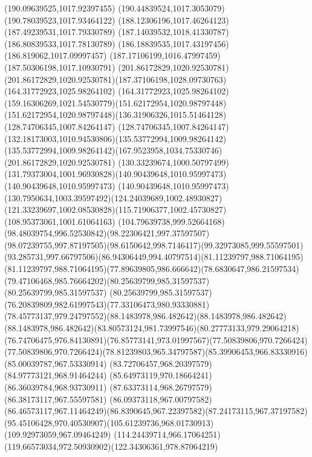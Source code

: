 {{	\lineto(190.09639525,1017.92397455)
	\lineto(190.44839524,1017.3053079)
	\lineto(190.78039523,1017.93464122)
	\closepath
	\moveto(188.12306196,1017.46264123)
	\lineto(187.49239531,1017.79330789)
	\lineto(187.14039532,1018.41330787)
	\lineto(186.80839533,1017.78130789)
	\lineto(186.18839535,1017.43197456)
	\lineto(186.819062,1017.09997457)
	\lineto(187.17106199,1016.47997459)
	\lineto(187.50306198,1017.10930791)
	\closepath
	\moveto(201.86172829,1020.92530781)
	\curveto(201.86172829,1020.92530781)(187.37106198,1028.09730763)(164.31772923,1025.98264102)
	\curveto(164.31772923,1025.98264102)(159.16306269,1021.54530779)(151.62172954,1020.98797448)
	\curveto(151.62172954,1020.98797448)(136.31906326,1015.51464128)(128.74706345,1007.84264147)
	\curveto(128.74706345,1007.84264147)(132.18173003,1010.94530806)(135.53772994,1009.98264142)
	\curveto(135.53772994,1009.98264142)(167.9523958,1034.75330746)(201.86172829,1020.92530781)
	\moveto(130.33239674,1000.50797499)
	\curveto(131.79373004,1001.96930828)(140.90439648,1010.95997473)(140.90439648,1010.95997473)
	\curveto(140.90439648,1010.95997473)(130.7950634,1003.39597492)(124.24039689,1002.48930827)
	\curveto(121.33239697,1002.08530828)(115.71906377,1002.45730827)(108.95373061,1001.61064163)
	\curveto(104.79639738,999.52664168)(98.48039754,996.52530842)(98.22306421,997.37597507)
	\curveto(98.07239755,997.87197505)(98.6150642,998.7146417)(99.32973085,999.55597501)
	\curveto(93.285731,997.66797506)(86.94306449,994.40797514)(81.11239797,988.71064195)
	\curveto(81.11239797,988.71064195)(77.89639805,986.666642)(78.6830647,986.21597534)
	\curveto(79.47106468,985.76664202)(80.25639799,985.31597537)(80.25639799,985.31597537)
	\curveto(80.25639799,985.31597537)(76.20839809,982.61997543)(77.33106473,980.93330881)
	\curveto(78.45773137,979.24797552)(88.1483978,986.482642)(88.1483978,986.482642)
	\curveto(88.1483978,986.482642)(83.80573124,981.73997546)(80.27773133,979.29064218)
	\curveto(76.74706475,976.84130891)(76.85773141,973.01997567)(77.50839806,970.7266424)
	\curveto(77.50839806,970.7266424)(78.81239803,965.34797587)(85.39906453,966.83330916)
	\lineto(85.00039787,967.53330914)
	\lineto(83.72706457,968.20397579)
	\lineto(84.97773121,968.91464244)
	\lineto(85.64973119,970.18664241)
	\lineto(86.36039784,968.93730911)
	\lineto(87.63373114,968.26797579)
	\lineto(86.38173117,967.55597581)
	\lineto(86.09373118,967.00797582)
	\curveto(86.46573117,967.11464249)(86.8390645,967.22397582)(87.24173115,967.37197582)
	\curveto(95.45106428,970.40530907)(105.61239736,968.01730913)(109.92973059,967.09464249)
	\curveto(114.24439714,966.17064251)(119.66573034,972.50930902)(122.34306361,978.87064219)
}}
